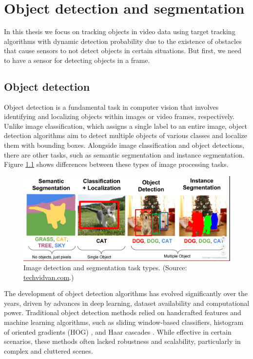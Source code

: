 \chapter{Object detection and segmentation}
In this thesis we focus on tracking objects in video data using target tracking algorithms with dynamic detection probability due to the existence of obstacles that cause sensors to not detect objects in certain situations. But first, we need to have a sensor for detecting objects in a
frame.


\section{Object detection}
Object detection is a fundamental task in computer vision that involves identifying and localizing objects
within images or video frames, respectively. Unlike image classification, which assigns a single label to an entire
image, object
detection algorithms aim to detect multiple objects of various classes and localize them with bounding boxes.
Alongside image classification and object detections, there are other tasks, such as semantic segmentation and
instance segmentation. Figure \ref{fig:seg_type} shows differences between these types of image processing tasks.

\begin{figure}
  \centering
  \includegraphics[width=\linewidth]{text/chapter_03/imgs/segmentation-types}
  \caption{Image detection and segmentation task types. (Source: \href{https://techvidvan.com/tutorials/image-segmentation-machine-learning/}{techvidvan.com}.)}
  \label{fig:seg_type}
\end{figure}

The development of object detection algorithms has evolved significantly over the years, driven by advances in deep
learning, dataset availability and computational power. Traditional object detection methods relied on handcrafted
features and machine learning algorithms, such as sliding window-based classifiers, histogram of oriented gradients (HOG) \cite{HoOGDalal2005}, and Haar cascades \cite{HaarCascadesLi2016}. While effective in certain scenarios, these methods often lacked robustness and scalability, particularly in complex and cluttered scenes.

